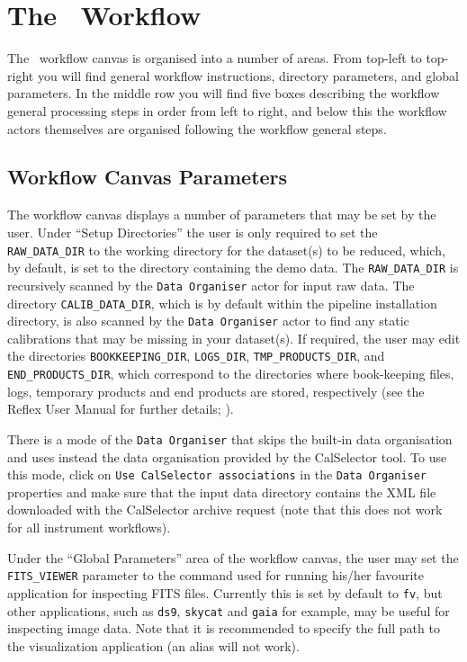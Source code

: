 \section{The \instname \ Workflow \label{sec:wkf_general_desc}}

The \instname\,  workflow canvas is organised into a number of areas.
From top-left to top-right you
will find general workflow instructions, directory parameters, and
global parameters.  In the middle row you will find five boxes
describing the workflow general processing steps in order from left to
right, and below this the workflow actors themselves are organised
following the workflow general steps. 

\subsection{Workflow Canvas Parameters \label{sec:wkf_canvpar}}

The workflow canvas displays a number of parameters that may be set by
the user. Under ``Setup
Directories'' the user is only required to set the {\tt
  RAW\_DATA\_DIR} to the working directory for the dataset(s) to be
reduced, which, by default, is set to the directory containing the
demo data. The {\tt RAW\_DATA\_DIR}
is recursively scanned by the {\tt Data Organiser} actor for input raw
data. The directory {\tt CALIB\_DATA\_DIR}, which is by default within the
pipeline installation directory, is also scanned by the {\tt Data
  Organiser} actor to find any static calibrations that may be missing
in your dataset(s).  If required, the user may edit the directories
{\tt BOOKKEEPING\_DIR}, {\tt LOGS\_DIR}, {\tt TMP\_PRODUCTS\_DIR}, and
{\tt END\_PRODUCTS\_DIR}, which correspond to the directories where
book-keeping files, logs, temporary products and end products are
stored, respectively (see the Reflex User Manual for further details;
\cite{REFLEXMAN}).

There is a mode of the {\tt Data Organiser} that skips the built-in
data organisation and uses instead the data organisation provided by
the CalSelector tool. To use this mode, click on {\tt Use CalSelector
  associations} in the {\tt Data Organiser} properties and make sure
that the input data directory contains the XML file downloaded with
the CalSelector archive request (note that this does not work for all
instrument workflows).

Under the ``Global Parameters'' area of the workflow canvas, the user
may set the {\tt FITS\_VIEWER} parameter to the command used for
running his/her favourite application for inspecting FITS
files. Currently this is set by default to {\tt fv}, but other
applications, such as {\tt ds9}, {\tt skycat} and {\tt gaia} for
example, may be useful for inspecting image data. Note that
it is recommended to specify the full path to the visualization
application (an alias will not work).

